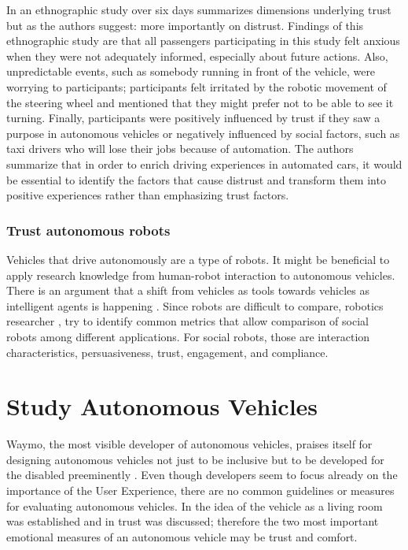 In an ethnographic study over six days \citet{Lee2016} summarizes dimensions underlying trust but as the authors suggest: more importantly on distrust.  Findings of this ethnographic study are that all passengers participating in this study felt anxious when they were not adequately informed, especially about future actions. Also, unpredictable events, such as somebody running in front of the vehicle, were worrying to participants; participants felt irritated by the robotic movement of the steering wheel and mentioned that they might prefer not to be able to see it turning. Finally, participants were positively influenced by trust if they saw a purpose in autonomous vehicles or negatively influenced by social factors, such as taxi drivers who will lose their jobs because of automation. The authors summarize that in order to enrich driving experiences in automated cars, it would be essential to identify the factors that cause distrust and transform them into positive experiences rather than emphasizing trust factors. 

\subsubsection{Trust autonomous robots}
Vehicles that drive autonomously are a type of robots. It might be beneficial to apply research knowledge from human-robot interaction to autonomous vehicles. There is an argument that a shift from vehicles as tools towards vehicles as intelligent agents is happening \citep{Thill}. Since robots are difficult to compare, robotics researcher \cite{Steinfeld2006}, try to identify common metrics that allow comparison of social robots among different applications. For social robots, those are interaction characteristics, persuasiveness, trust, engagement, and compliance. 

\section{Study Autonomous Vehicles}\label{sec:studies}
Waymo, the most visible developer of autonomous vehicles, praises itself for designing autonomous vehicles not just to be inclusive but to be developed for the disabled preeminently \citep{Waymo2018DriverlessApplication}. Even though developers seem to focus already on the importance of the User Experience, there are no common guidelines or measures for evaluating autonomous vehicles. In \emph{} the idea of the vehicle as a living room was established and in \emph{} trust was discussed; therefore the two most important emotional measures of an autonomous vehicle may be trust and comfort.  


